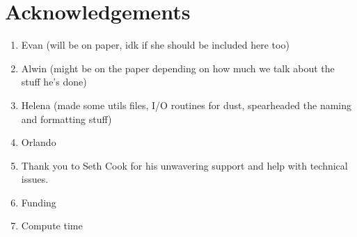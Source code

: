 \section{Acknowledgements}

\begin{enumerate}
    \item Evan (will be on paper, idk if she should be included here too)
    \item Alwin (might be on the paper depending on how much we talk about the stuff he's done)
    \item Helena (made some utils files, I/O routines for dust, spearheaded the naming and formatting stuff)
    \item Orlando
    \item Thank you to Seth Cook for his unwavering support and help with technical issues.
    \item Funding
    \item Compute time
\end{enumerate}